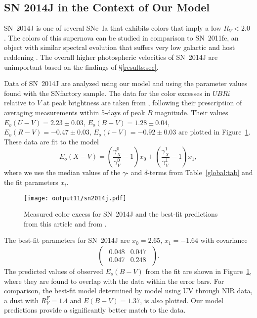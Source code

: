 \documentclass{aastex61}   	%
\begin{document}
\subsection{SN 2014J in the Context of Our Model}
\label{sn2014j:sec}

SN~2014J   is one of several SNe~Ia that exhibits colors that imply a low $R_V<2.0$ \citep{2014ApJ...788L..21A, 2014MNRAS.443.2887F, 
2014arXiv1411.3332J,
2014ApJ...795L...4K, 2015ApJ...805...74B}.
The colors of this supernova can be studied in comparison to SN~2011fe, an object with similar
spectral evolution that 
suffers very low galactic and host reddening
\citep[this technique has been used in][]{2006MNRAS.369.1880E,2007AJ....133...58K,2008MNRAS.384..107E,2010AJ....139..120F, 2014ApJ...788L..21A}.
The overall higher photospheric velocities of
SN~2014J are unimportant  based on the findings of  \S\ref{results:sec}.


Data of SN~2014J are  analyzed using our model and using the parameter values found with the SNfactory sample.
The data for the color excesses  in $UBRi$  relative to $V$ at peak brightness  are taken from \citet{2014ApJ...788L..21A},
following their prescription of averaging measurements within 5-days of peak $B$ magnitude.
Their values 
$E_o(U-V) =   2.23 \pm   0.03$,
$E_o(B-V) =   1.28 \pm   0.04$,
$E_o(R-V) =  -0.47 \pm   0.03$,
$E_o(i-V) =  -0.92 \pm   0.03$
are plotted in Figure~\ref{sn2014j:fig}.
These data are fit to the model
\begin{equation}
E_o(X-V) =  \left(\frac{\gamma^0_X}{\gamma^0_V}-1\right)x_0 +  \left(\frac{\gamma^1_X}{\gamma^1_V}-1\right)x_1,
\end{equation}
where we use the median values of the $\gamma$- and $\delta$-terms from Table~\ref{global:tab} and the fit
parameters $x_i $.

\begin{figure}[htbp] %
   \centering
   \texttt{[image: output11/sn2014j.pdf]} 
   \caption{Measured color excess for SN~2014J and the best-fit predictions from this article and from  \citet{2014ApJ...788L..21A}.
   \label{sn2014j:fig}}
\end{figure}

The best-fit parameters for SN~2014J are 
$x_0= 2.65$, $ x_1=-1.64$ with covariance
\begin{equation}
\begin{pmatrix}
\begin{array}{rr}
0.048 & 0.047 \\
0.047 & 0.248
\end{array}
\end{pmatrix}.
\end{equation}
The predicted values of observed $E_o(B-V)$ from the fit are shown in Figure~\ref{sn2014j:fig}, where they are found to
overlap with the data within the error bars.   For comparison, the best-fit model determined by  \citet{2014ApJ...788L..21A} model using
UV through NIR data,
a  \citet{1999PASP..111...63F} dust with $R_V^F=1.4$ and $E(B-V)=1.37$, 
is also plotted.  Our model predictions provide a significantly better match to the data.
\end{document}
